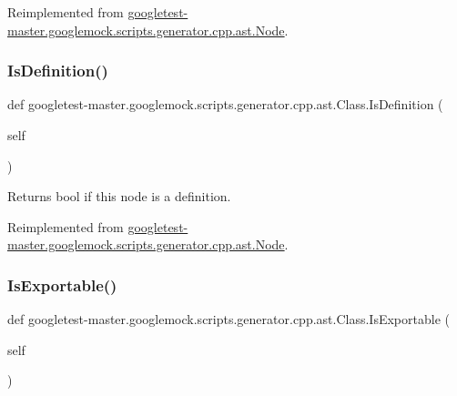 Reimplemented from \mbox{\hyperlink{classgoogletest-master_1_1googlemock_1_1scripts_1_1generator_1_1cpp_1_1ast_1_1_node_ac675d48443725155c9e5a16a4079a163}{googletest-\/master.\+googlemock.\+scripts.\+generator.\+cpp.\+ast.\+Node}}.

\mbox{\label{classgoogletest-master_1_1googlemock_1_1scripts_1_1generator_1_1cpp_1_1ast_1_1_class_a79ec9f801f17c9f4d7868e0b1d10d10d}} 
\subsubsection{\texorpdfstring{IsDefinition()}{IsDefinition()}}
{\footnotesize\ttfamily def googletest-\/master.\+googlemock.\+scripts.\+generator.\+cpp.\+ast.\+Class.\+Is\+Definition (\begin{DoxyParamCaption}\item[{}]{self }\end{DoxyParamCaption})}

\begin{DoxyVerb}Returns bool if this node is a definition.\end{DoxyVerb}
 

Reimplemented from \mbox{\hyperlink{classgoogletest-master_1_1googlemock_1_1scripts_1_1generator_1_1cpp_1_1ast_1_1_node_a3a3edec9cd30222cfea1295005abadd3}{googletest-\/master.\+googlemock.\+scripts.\+generator.\+cpp.\+ast.\+Node}}.

\mbox{\label{classgoogletest-master_1_1googlemock_1_1scripts_1_1generator_1_1cpp_1_1ast_1_1_class_a3b7f1d83393fd1bdd228a4e3be88f21f}} 
\subsubsection{\texorpdfstring{IsExportable()}{IsExportable()}}
{\footnotesize\ttfamily def googletest-\/master.\+googlemock.\+scripts.\+generator.\+cpp.\+ast.\+Class.\+Is\+Exportable (\begin{DoxyParamCaption}\item[{}]{self }\end{DoxyParamCaption})}

